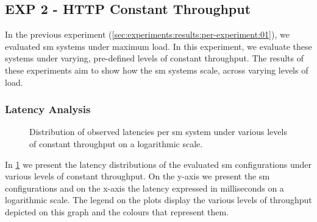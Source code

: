 \subsection{\textbf{EXP 2} - HTTP Constant Throughput}
\label{sec:experiments:results:per-experiment:02}

In the previous experiment (\cref{sec:experiments:results:per-experiment:01}), we evaluated \gls{sm} systems under maximum load. In this experiment, we evaluate these systems under varying, pre-defined levels of constant throughput. The results of these experiments aim to show how the \gls{sm} systems scale, across varying levels of load.

\subsubsection{Latency Analysis}
\label{sec:experiments:results:per-experiment:02:latency}

\begin{figure}[t]
    \centering

    
    \caption[Experiment 2 - Distribution of observed latencies per \gls{sm} system under various levels of constant throughput.]{Distribution of observed latencies per \gls{sm} system under various levels of constant throughput on a logarithmic scale.}
    
    \label{fig:exp:02:latency-distributions}

\end{figure}


In \cref{fig:exp:02:latency-distributions} we present the latency distributions of the evaluated \gls{sm} configurations under various levels of constant throughput.  On the y-axis we present the \gls{sm} configurations and on the x-axis the latency expressed in milliseconds on a logarithmic scale. The legend on the plots display the various levels of throughput depicted on this graph and the colours that represent them.

